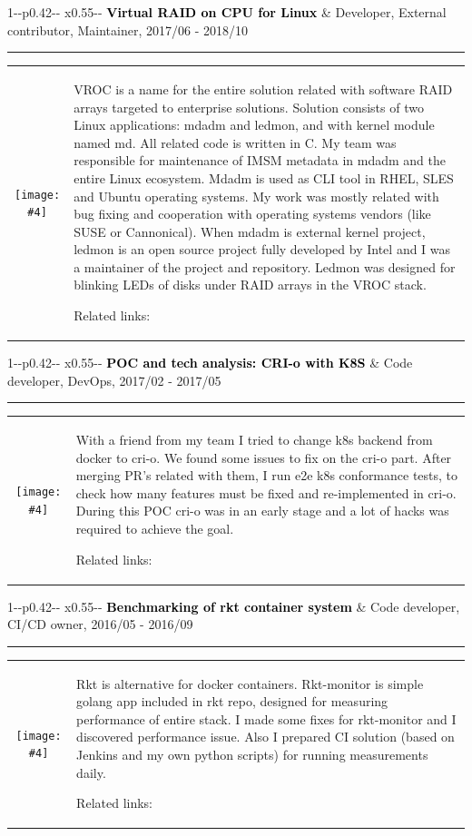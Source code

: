 \documentclass[11pt,A4]{article}
\newcommand{\mpwidth}{\linewidth-\fboxsep-\fboxsep}
\newcommand{\portfolioitem}[8]
{
\medskip
\vspace{1pt}
	\begin{tabular*}{1\mpwidth}{p{0.42\mpwidth}  x{0.55\mpwidth}}
 	\textcolor{black}{\textbf{#2}} & \textcolor{complcol}{#3}, \textcolor{bgcol}{#1}

	\end{tabular*}
\vspace{-12pt}
\textcolor{softcol}{\hrule}
\vspace{5pt}
  \begin{tabular}{ c m{13cm} }
    \begin{minipage}{.3\textwidth}
         \textcolor{white}{#8}\texttt{[image: \#4]}
    \end{minipage}
    & #6

Related links: #7 \\
  \end{tabular}
}
\newcommand{\portfoliohref}[2]{
\href[pdfnewwindow=true]{#1}{\color{complcol}{#2}}
}
\begin{document}
\portfolioitem{2017/06 - 2018/10}{Virtual RAID on CPU for Linux}{Developer, External contributor, Maintainer}{img/vroc.jpg}{1.0}
{VROC is a name for the entire solution related with software RAID arrays targeted to enterprise solutions. Solution consists of two Linux applications: mdadm and ledmon, and with kernel module named md. All related code is written in C. My team was responsible for maintenance of IMSM metadata in mdadm and the entire Linux ecosystem. Mdadm is used as CLI tool in RHEL, SLES and Ubuntu operating systems. My work was mostly related with bug fixing and cooperation with operating systems vendors (like SUSE or Cannonical). When mdadm is external kernel project, ledmon is an open source project fully developed by Intel and I was a maintainer of the project and repository. Ledmon was designed for blinking LEDs of disks under RAID arrays in the VROC stack.}
{\portfoliohref{https://github.com/intel/ledmon/commits?author=mzylowski}{My ledmon commits} | \portfoliohref{https://git.kernel.org/pub/scm/linux/kernel/git/torvalds/linux.git/commit/scripts/checkpatch.pl?id=6ad724e2a48fc24dd9788490d85a3490cb0117c1}{Kernel patch} | \portfoliohref{https://git.kernel.org/pub/scm/utils/mdadm/mdadm.git/log/?qt=grep\&q=Michal+Zylowski}{My mdadm patches}}{}

\portfolioitem{2017/02 - 2017/05}{POC and tech analysis: CRI-o with K8S}{Code developer, DevOps}{img/crio-logo.png}{1}
{With a friend from my team I tried to change k8s backend from docker to cri-o. We found some issues to fix on the cri-o part. After merging PR’s related with them, I run e2e k8s conformance tests, to check how many features must be fixed and re-implemented in cri-o. During this POC cri-o was in an early stage and a lot of hacks was required to achieve the goal.}
{\portfoliohref{https://github.com/cri-o/cri-o/pull/342}{Example of contribution} | \portfoliohref{https://github.com/cri-o/cri-o/pull/353}{Result of the POC}}{}

\portfolioitem{2016/05 - 2016/09}{Benchmarking of rkt container system}{Code developer, CI/CD owner}{img/rkt.png}{0.9}
{Rkt is alternative for docker containers. Rkt-monitor is simple golang app included in rkt repo, designed for measuring performance of entire stack. I made some fixes for rkt-monitor and I discovered performance issue. Also I prepared CI solution (based on Jenkins and my own python scripts) for  running measurements daily.}
{\portfoliohref{https://github.com/rkt/rkt/pull/3093/files}{Example of contribution} | \portfoliohref{https://github.com/rkt/rkt/issues/3019}{Discovered issue}}{}
\end{document}
